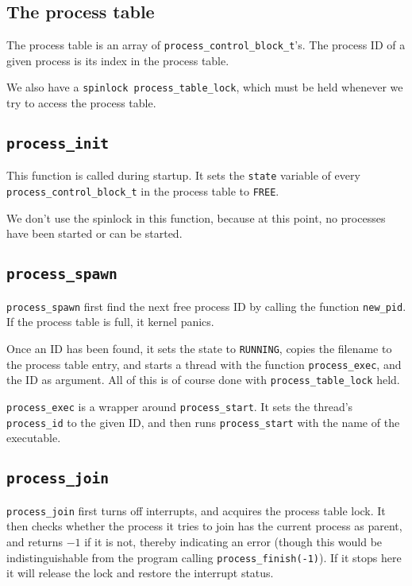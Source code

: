 \documentclass{article}
\begin{document}
\subsection{The process table}
The process table is an array of \texttt{process\_control\_block\_t}'s. The process ID of a given process is its index in the process table.

We also have a \texttt{spinlock process\_table\_lock}, which must be held whenever we try to access the process table.

\subsection{\texttt{process\_init}}
This function is called during startup. It sets the \texttt{state} variable of every \texttt{process\_control\_block\_t} in the process table to \texttt{FREE}.

We don't use the spinlock in this function, because at this point, no processes have been started or can be started.

\subsection{\texttt{process\_spawn}}
\texttt{process\_spawn} first find the next free process ID by calling the function \texttt{new\_pid}. If the process table is full, it kernel panics.

Once an ID has been found, it sets the state to \texttt{RUNNING}, copies the filename to the process table entry, and starts a thread with the function \texttt{process\_exec}, and the ID as argument. All of this is of course done with \texttt{process\_table\_lock} held.

\texttt{process\_exec} is a wrapper around \texttt{process\_start}. It sets the thread's \texttt{process\_id} to the given ID, and then runs \texttt{process\_start} with the name of the executable.

\subsection{\texttt{process\_join}}
\texttt{process\_join} first turns off interrupts, and acquires the process table lock.
It then checks whether the process it tries to join
has the current process as parent, and returns $-1$ if it is
not, thereby indicating an error (though this would be indistinguishable from the
program calling \texttt{process\_finish(-1)}). If it stops here it will release the lock and
restore the interrupt status.
\end{document}
